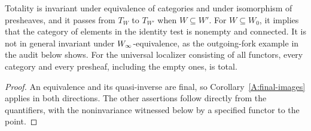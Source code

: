 \begin{remark}\label{A:invariance}
Totality is invariant under equivalence of categories and under isomorphism of presheaves, and it passes from $T_W$ to $T_{W'}$ when $W\subseteq W'$. For $W\subseteq W_0$, it implies that the category of elements in the identity test is nonempty and connected. It is not in general invariant under $W_{\infty}$-equivalence, as the outgoing-fork example in the audit below shows. For the universal localizer consisting of all functors, every category and every presheaf, including the empty ones, is total.
\end{remark}

\begin{proof}
An equivalence and its quasi-inverse are final, so Corollary~\ref{A:final-images} applies in both directions. The other assertions follow directly from the quantifiers, with the noninvariance witnessed below by a specified functor to the point.
\end{proof}
